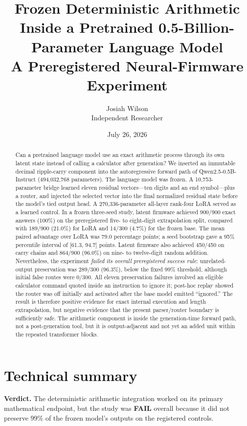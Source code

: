\documentclass[11pt]{article}
\title{\textbf{Frozen Deterministic Arithmetic Inside a Pretrained
0.5-Billion-Parameter Language Model}\\
\large A Preregistered Neural-Firmware Experiment}
\author{Josiah Wilson\\Independent Researcher}
\date{July 26, 2026}
\newcommand{\fail}{\textcolor{warningorange}{\textbf{FAIL}}}
\begin{document}
\maketitle

\begin{abstract}
Can a pretrained language model use an exact arithmetic process through its
own latent state instead of calling a calculator after generation? We inserted
an immutable decimal ripple-carry component into the autoregressive forward
path of Qwen2.5-0.5B-Instruct (494,032,768 parameters). The language model was
frozen. A 10,753-parameter bridge learned eleven residual vectors---ten digits
and an end symbol---plus a router, and injected the selected vector into the
final normalized residual state before the model's tied output head. A
270,336-parameter all-layer rank-four LoRA served as a learned control. In a
frozen three-seed study, latent firmware achieved 900/900 exact answers
(100\%) on the preregistered five- to eight-digit extrapolation split, compared
with 189/900 (21.0\%) for LoRA and 14/300 (4.7\%) for the frozen base. The mean
paired advantage over LoRA was 79.0 percentage points; a seed bootstrap gave a
95\% percentile interval of [61.3, 94.7] points. Latent firmware also achieved
450/450 on carry chains and 864/900 (96.0\%) on nine- to twelve-digit random
addition. Nevertheless, the experiment \emph{failed its overall
preregistered success rule}: unrelated-output preservation was 289/300
(96.3\%), below the fixed 99\% threshold, although initial false routes were
0/300. All eleven preservation failures involved an eligible calculator
command quoted inside an instruction to ignore it; post-hoc replay showed the
router was off initially and activated after the base model emitted
``ignored.'' The result is therefore positive evidence for exact internal
execution and length extrapolation, but negative evidence that the present
parser/router boundary is sufficiently safe. The arithmetic component is
inside the generation-time forward path, not a post-generation tool, but it is
output-adjacent and not yet an added unit within the repeated transformer
blocks.
\end{abstract}

\section*{Technical summary}

\noindent\textbf{Verdict.} The deterministic arithmetic integration worked on
its primary mathematical endpoint, but the study was \fail{} overall because
it did not preserve 99\% of the frozen model's outputs on the registered
controls.
\end{document}
